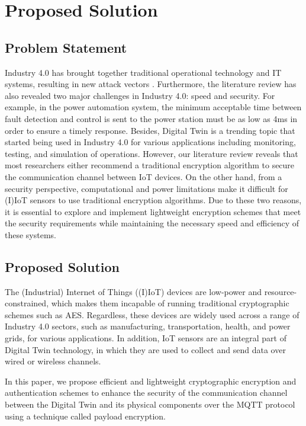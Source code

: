 
\section{Proposed Solution}

\subsection{Problem Statement}
Industry 4.0 has brought together traditional operational technology and IT systems, resulting in new attack vectors \cite{dietzUnleashingDigitalTwin2020}. Furthermore, the literature review has also revealed two major challenges in Industry 4.0: speed and security. For example, in the power automation system, the minimum acceptable time between fault detection and control is sent to the power station must be as low as 4ms \cite{rajkumar_cyber_2020} in order to ensure a timely response. Besides, Digital Twin is a trending topic that started being used in Industry 4.0 for various applications including monitoring, testing, and simulation of operations. However, our literature review reveals that most researchers either recommend a traditional encryption algorithm to secure the communication channel between IoT devices. On the other hand, from a security perspective, computational and power limitations make it difficult for (I)IoT sensors to use traditional encryption algorithms. Due to these two reasons, it is essential to explore and implement  lightweight encryption schemes that meet the security requirements while maintaining the necessary speed and efficiency of these systems.

\subsection{Proposed Solution}
The (Industrial) Internet of Things ((I)IoT) devices are low-power and resource-constrained, which makes them incapable of running traditional cryptographic schemes such as AES. Regardless, these devices are widely used across a range of Industry 4.0 sectors, such as manufacturing, transportation, health, and power grids, for various applications. In addition, IoT sensors are an integral part of Digital Twin technology, in which they are used to collect and send data over wired or wireless channels.

In this paper, we propose efficient and lightweight cryptographic encryption and authentication schemes to enhance the security of the communication channel between the Digital Twin and its physical components over the MQTT protocol using a technique called payload encryption.

